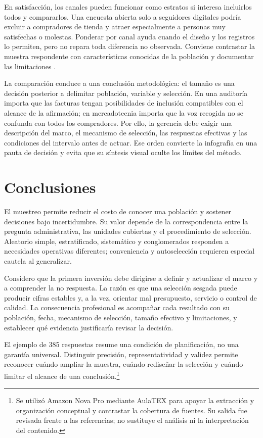 {En satisfacción, los canales pueden funcionar como estratos si interesa incluirlos todos y compararlos. Una encuesta abierta solo a seguidores digitales podría excluir a compradores de tienda y atraer especialmente a personas muy satisfechas o molestas. Ponderar por canal ayuda cuando el diseño y los registros lo permiten, pero no repara toda diferencia no observada. Conviene contrastar la muestra respondente con características conocidas de la población y documentar las limitaciones \citep{holmesBusiness2023,bradley2021}.

La comparación conduce a una conclusión metodológica: el tamaño es una decisión posterior a delimitar población, variable y selección. En una auditoría importa que las facturas tengan posibilidades de inclusión compatibles con el alcance de la afirmación; en mercadotecnia importa que la voz recogida no se confunda con todos los compradores. Por ello, la gerencia debe exigir una descripción del marco, el mecanismo de selección, las respuestas efectivas y las condiciones del intervalo antes de actuar. Ese orden convierte la infografía en una pauta de decisión y evita que su síntesis visual oculte los límites del método.

\clearpage
\section{Conclusiones}
El muestreo permite reducir el costo de conocer una población y sostener decisiones bajo incertidumbre. Su valor depende de la correspondencia entre la pregunta administrativa, las unidades cubiertas y el procedimiento de selección. Aleatorio simple, estratificado, sistemático y conglomerados responden a necesidades operativas diferentes; conveniencia y autoselección requieren especial cautela al generalizar.

Considero que la primera inversión debe dirigirse a definir y actualizar el marco y a comprender la no respuesta. La razón es que una selección sesgada puede producir cifras estables y, a la vez, orientar mal presupuesto, servicio o control de calidad. La consecuencia profesional es acompañar cada resultado con su población, fecha, mecanismo de selección, tamaño efectivo y limitaciones, y establecer qué evidencia justificaría revisar la decisión.

El ejemplo de 385 respuestas resume una condición de planificación, no una garantía universal. Distinguir precisión, representatividad y validez permite reconocer cuándo ampliar la muestra, cuándo rediseñar la selección y cuándo limitar el alcance de una conclusión.\footnote{Se utilizó Amazon Nova Pro mediante AulaTEX para apoyar la extracción y organización conceptual y contrastar la cobertura de fuentes. Su salida fue revisada frente a las referencias; no sustituye el análisis ni la interpretación del contenido.}

}

